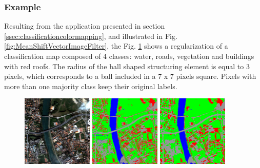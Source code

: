 \subsubsection{Example}

Resulting from the  application presented in section \ref{ssec:classificationcolormapping}, and illustrated in
Fig. \ref{fig:MeanShiftVectorImageFilter}, the Fig. \ref{fig:ClassificationMapRegularizationApplication} shows a regularization of a classification
map composed of 4 classes: water, roads, vegetation and buildings with red roofs. The radius of the ball shaped structuring element is equal to 3 pixels,
which corresponds to a ball included in a 7 x 7 pixels square. Pixels with more than one majority class keep their original labels.

\begin{figure}[!h]
  \center
  \includegraphics[width=0.3\textwidth]{../Art/MonteverdiImages/classification_chain_inputimage.jpg}
  \includegraphics[width=0.3\textwidth]{../Art/MonteverdiImages/classification_chain_fancyclassif_CMR_input.png}
  \includegraphics[width=0.3\textwidth]{../Art/MonteverdiImages/classification_chain_fancyclassif_CMR_3.png}
  \label{fig:ClassificationMapRegularizationApplication}
\end{figure}

